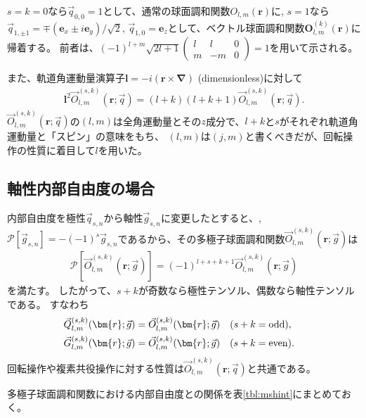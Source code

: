 \documentclass[11pt]{easymemo}
\begin{document}
$s=k=0$なら$\vec{q}_{0,0}=1$として、通常の球面調和関数$O_{l,m}(\bm{r})$に, $s=1$なら$\vec{q}_{1,\pm1}=\mp(\bm{e}_{x}\pm i\bm{e}_{y})/\sqrt{2}$, $\vec{q}_{1,0}=\bm{e}_{z}$として、ベクトル球面調和関数$\bm{O}_{l,m}^{(k)}(\bm{r})$に帰着する。
前者は、$(-1)^{l+m}\sqrt{2l+1}\begin{pmatrix} l & l & 0 \\ m & -m & 0 \end{pmatrix}=1$を用いて示される。

また、軌道角運動量演算子$\bm{l}=-i(\bm{r}\times\bm{\nabla})$ (dimensionless)に対して
\begin{align}
\bm{l}^{2}\vec{O}_{l,m}^{(s,k)}(\bm{r};\vec{q})=(l+k)(l+k+1)\vec{O}_{l,m}^{(s,k)}(\bm{r};\vec{q}).
\end{align}
$\vec{O}_{l,m}^{(s,k)}(\bm{r};\vec{q})$の$(l,m)$は全角運動量とその$z$成分で、$l+k$と$s$がそれぞれ軌道角運動量と「スピン」の意味をもち、
$(l,m)$は$(j,m)$と書くべきだが、回転操作の性質に着目して$l$を用いた。

\subsection{軸性内部自由度の場合}

内部自由度を極性$\vec{q}_{s,n}$から軸性$\vec{g}_{s,n}$に変更したとすると、, $\mathcal{P}[\vec{g}_{s,n}]=-(-1)^{s}\vec{g}_{s,n}$であるから、その多極子球面調和関数$\vec{O}_{l,m}^{(s,k)}(\bm{r};\vec{g})$は
\begin{align}
\mathcal{P}[\vec{O}_{l,m}^{(s,k)}(\bm{r};\vec{g})]=(-1)^{l+s+k+1}\vec{O}_{l,m}^{(s,k)}(\bm{r};\vec{g})
\end{align}
を満たす。
したがって、$s+k$が奇数なら極性テンソル、偶数なら軸性テンソルである。
すなわち
\begin{align}
&
\vec{Q}_{l,m}^{(s,k)}(\bm{r};\vec{g})=\vec{O}_{l,m}^{(s,k)}(\bm{r};\vec{g})
\quad
(s+k={\rm odd}),
\cr&
\vec{G}_{l,m}^{(s,k)}(\bm{r};\vec{g})=\vec{O}_{l,m}^{(s,k)}(\bm{r};\vec{g})
\quad
(s+k={\rm even}).
\end{align}
回転操作や複素共役操作に対する性質は$\vec{O}_{l,m}^{(s,k)}(\bm{r};\vec{q})$と共通である。

多極子球面調和関数における内部自由度との関係を表\ref{tbl:mshint}にまとめておく。
\end{document}
